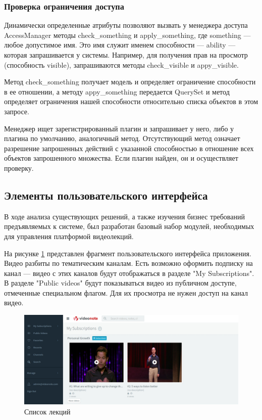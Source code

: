 \FloatBarrier

\subsubsection{Проверка ограничения доступа}

Динамически определенные атрибуты позволяют вызвать у менеджера доступа AccessManager методы check\_something и apply\_something,
где something — любое допустимое имя. Это имя служит именем способности — ability — которая запрашивается у системы.
Например, для получения прав на просмотр (способность visible), запрашиваются методы check\_visible и appy\_visible.

Метод check\_something получает модель и определяет ограничение способности в ее отношении, а методу appy\_something
передается QuerySet и метод определяет ограничения нашей способности относительно списка объектов в этом запросе.

Менеджер ищет зарегистрированный плагин и запрашивает у него, либо у плагина по умолчанию, аналогичный метод.
Отсутствующий метод означает разрешение запрошенных действий с указанной способностью в отношение всех объектов
запрошенного множества. Если плагин найден, он и осуществляет проверку.

\subsection{Элементы пользовательского интерфейса}

В ходе анализа существующих решений, а также изучения бизнес требований предъявляемых
к системе, был разработан базовый набор модулей, необходимых для управления платформой
видеолекций.

На рисунке \ref{user-interface} представлен фрагмент пользовательского интерфейса приложения.
Видео разбиты по тематическим каналам. Есть возможно оформить подписку на канал —
видео с этих каналов будут отображаться в разделе "My Subscriptions". В разделе "Public videos"
будут показываться видео из публичном доступе, отмеченные специальном флагом. Для их просмотра
не нужен доступ на канал видео.

\begin{figure}[H]
  \centering
  \includegraphics[width=1\textwidth]{images/user-interface.jpg}
  \caption{Список лекций\label{user-interface}}
\end{figure}

